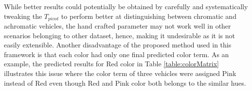 While better results could potentially be obtained by carefully and systematically tweaking the $T_{pivot}$ to perform better at distinguishing between chromatic and achromatic vehicles, the hand crafted parameter may not work well in other scenarios belonging to other dataset, hence, making it undesirable as it is not easily extensible. Another disadvantage of the proposed method used in this framework is that each color had only one final predicted color term. As an example, the predicted results for Red color in Table \ref{table:colorMatrix} illustrates this issue where the color term of three vehicles were assigned Pink instead of Red even though Red and Pink color both belongs to the similar hues. 


\begin{table}[]
\centering
\caption{Confusion matrix for color retrieval task}
\vspace{1.5em}
\label{table:colorMatrix}
\end{table}
